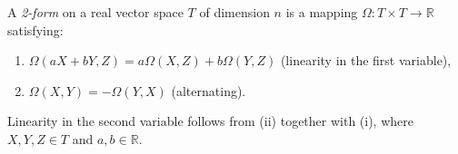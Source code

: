 A \textit{2-form} on a real vector space $T$ of dimension $n$ is a mapping $\Omega: T \times T \to \mathbb{R}$ satisfying:
\begin{enumerate}
  \item[(i)] $\Omega(aX + bY, Z) = a\Omega(X, Z) + b\Omega(Y, Z)$ (linearity in the first variable),
  \item[(ii)] $\Omega(X, Y) = -\Omega(Y, X)$ (alternating).
\end{enumerate}
Linearity in the second variable follows from (ii) together with (i), where $X, Y, Z \in T$ and $a, b \in \mathbb{R}$.
